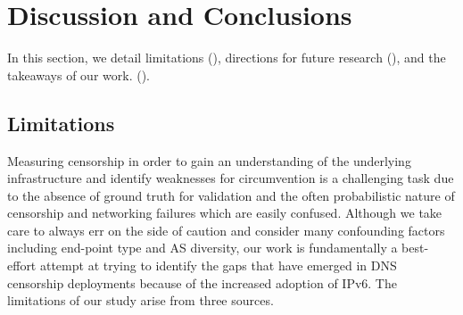 \section{Discussion and Conclusions} \label{sec:discussion}

In this section, we detail limitations
(), directions for future research
(), and the takeaways of our work.
().

%

\subsection{Limitations}
\label{sec:discussion:limitations}
Measuring censorship in order to gain an understanding of the underlying
infrastructure and identify weaknesses for circumvention is a challenging task
due to the absence of ground truth for validation and the often probabilistic
nature of censorship and networking failures which are easily confused.
%
Although we take care to always err on the side of caution and consider many
confounding factors including end-point type and AS diversity, our work is
fundamentally a best-effort attempt at trying to identify the gaps that have
emerged in DNS censorship deployments because of the increased adoption of
IPv6. The limitations of our study arise from three sources.

